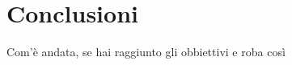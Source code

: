 
\chapter{Conclusioni}\label{chap:conclusions}
Com'è andata, se hai raggiunto gli obbiettivi e roba così